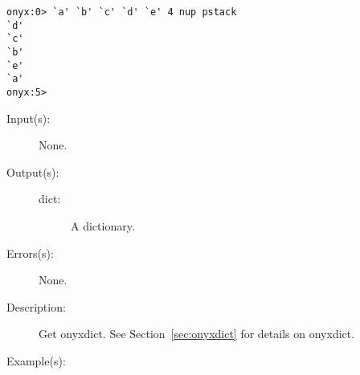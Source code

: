 \begin{description}
\begin{description}
\begin{verbatim}
onyx:0> `a' `b' `c' `d' `e' 4 nup pstack
`d'
`c'
`b'
`e'
`a'
onyx:5>
		\end{verbatim}
	\end{description}
\label{systemdict:onyxdict}
\item[{\onyxop{--}{onyxdict}{dict}}: ]
	\begin{description}\item[]
	\item[Input(s): ] None.
	\item[Output(s): ]
		\begin{description}\item[]
		\item[dict: ]
			A dictionary.
		\end{description}
	\item[Errors(s): ] None.
	\item[Description: ]
		Get onyxdict.  See Section~\ref{sec:onyxdict} for details on
		onyxdict.
	\item[Example(s): ]\begin{verbatim}


\end{verbatim}
\end{description}
\end{description}
